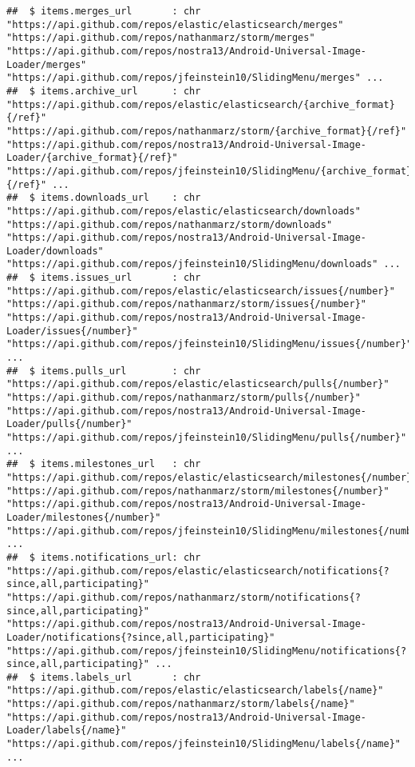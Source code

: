 \documentclass{article}\usepackage[]{graphicx}\usepackage[]{color}
\makeatletter
\newenvironment{kframe}{%
 \def\at@end@of@kframe{}%
 \ifinner\ifhmode%
  \def\at@end@of@kframe{\end{minipage}}%
  \begin{minipage}{\columnwidth}%
 \fi\fi%
 \def\FrameCommand##1{\hskip\@totalleftmargin \hskip-\fboxsep
 \colorbox{shadecolor}{##1}\hskip-\fboxsep
     \hskip-\linewidth \hskip-\@totalleftmargin \hskip\columnwidth}%
 \MakeFramed {\advance\hsize-\width
   \@totalleftmargin\z@ \linewidth\hsize
   \@setminipage}}%
 {\par\unskip\endMakeFramed%
 \at@end@of@kframe}
\newenvironment{knitrout}{}{} %
\makeatother
\begin{document}
\begin{knitrout}
\begin{kframe}
\begin{verbatim}
##  $ items.merges_url       : chr  "https://api.github.com/repos/elastic/elasticsearch/merges" "https://api.github.com/repos/nathanmarz/storm/merges" "https://api.github.com/repos/nostra13/Android-Universal-Image-Loader/merges" "https://api.github.com/repos/jfeinstein10/SlidingMenu/merges" ...
##  $ items.archive_url      : chr  "https://api.github.com/repos/elastic/elasticsearch/{archive_format}{/ref}" "https://api.github.com/repos/nathanmarz/storm/{archive_format}{/ref}" "https://api.github.com/repos/nostra13/Android-Universal-Image-Loader/{archive_format}{/ref}" "https://api.github.com/repos/jfeinstein10/SlidingMenu/{archive_format}{/ref}" ...
##  $ items.downloads_url    : chr  "https://api.github.com/repos/elastic/elasticsearch/downloads" "https://api.github.com/repos/nathanmarz/storm/downloads" "https://api.github.com/repos/nostra13/Android-Universal-Image-Loader/downloads" "https://api.github.com/repos/jfeinstein10/SlidingMenu/downloads" ...
##  $ items.issues_url       : chr  "https://api.github.com/repos/elastic/elasticsearch/issues{/number}" "https://api.github.com/repos/nathanmarz/storm/issues{/number}" "https://api.github.com/repos/nostra13/Android-Universal-Image-Loader/issues{/number}" "https://api.github.com/repos/jfeinstein10/SlidingMenu/issues{/number}" ...
##  $ items.pulls_url        : chr  "https://api.github.com/repos/elastic/elasticsearch/pulls{/number}" "https://api.github.com/repos/nathanmarz/storm/pulls{/number}" "https://api.github.com/repos/nostra13/Android-Universal-Image-Loader/pulls{/number}" "https://api.github.com/repos/jfeinstein10/SlidingMenu/pulls{/number}" ...
##  $ items.milestones_url   : chr  "https://api.github.com/repos/elastic/elasticsearch/milestones{/number}" "https://api.github.com/repos/nathanmarz/storm/milestones{/number}" "https://api.github.com/repos/nostra13/Android-Universal-Image-Loader/milestones{/number}" "https://api.github.com/repos/jfeinstein10/SlidingMenu/milestones{/number}" ...
##  $ items.notifications_url: chr  "https://api.github.com/repos/elastic/elasticsearch/notifications{?since,all,participating}" "https://api.github.com/repos/nathanmarz/storm/notifications{?since,all,participating}" "https://api.github.com/repos/nostra13/Android-Universal-Image-Loader/notifications{?since,all,participating}" "https://api.github.com/repos/jfeinstein10/SlidingMenu/notifications{?since,all,participating}" ...
##  $ items.labels_url       : chr  "https://api.github.com/repos/elastic/elasticsearch/labels{/name}" "https://api.github.com/repos/nathanmarz/storm/labels{/name}" "https://api.github.com/repos/nostra13/Android-Universal-Image-Loader/labels{/name}" "https://api.github.com/repos/jfeinstein10/SlidingMenu/labels{/name}" ...

\end{verbatim}
\end{kframe}
\end{knitrout}
\end{document}
